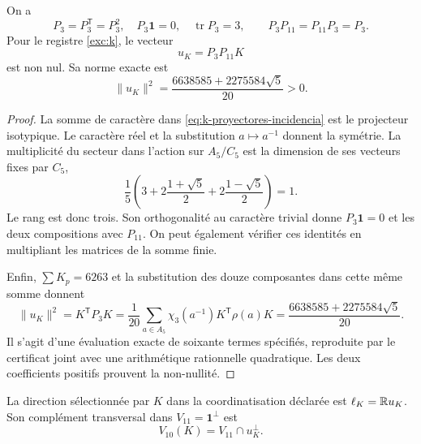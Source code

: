 \begin{lemma}
\label{lem:k-sector-no-nulo}
On a
\[
 P_3=P_3^{\mathsf T}=P_3^2,\quad
 P_3\mathbf1=0,\quad \operatorname{tr}P_3=3,
 \qquad P_3P_{11}=P_{11}P_3=P_3.
\]
Pour le registre \eqref{exc:k}, le vecteur
\begin{equation}
 u_K=P_3P_{11}K
 \label{eq:k-vector-direccional}
\end{equation}
est non nul. Sa norme exacte est
\begin{equation}
 \lVert u_K\rVert^2
 =\frac{6638585+2275584\sqrt5}{20}>0.
 \label{eq:k-norma-direccion}
\end{equation}
\end{lemma}
\begin{proof}
La somme de caractère dans \eqref{eq:k-proyectores-incidencia} est le
projecteur isotypique. Le caractère réel et la substitution \(a\mapsto a^{-1}\)
donnent la symétrie. La multiplicité du secteur dans l'action sur
\(A_5/C_5\) est la dimension de ses vecteurs fixes par \(C_5\),
\[
 \frac15\left(3+2\frac{1+\sqrt5}{2}
                 +2\frac{1-\sqrt5}{2}\right)=1.
\]
Le rang est donc trois. Son orthogonalité au caractère trivial donne \(P_3\mathbf1=0\) et les deux compositions avec \(P_{11}\). On peut également vérifier ces identités en multipliant les matrices de la somme finie.

Enfin, \(\sum K_p=6263\) et la substitution des douze
composantes dans cette même somme donnent
\[
 \lVert u_K\rVert^2=K^{\mathsf T}P_3K
 =\frac1{20}\sum_{a\in A_5}
                \chi_3(a^{-1})K^{\mathsf T}\rho(a)K
 =\frac{6638585+2275584\sqrt5}{20}.
\]
Il s'agit d'une évaluation exacte de soixante termes spécifiés,
reproduite par le certificat joint avec une arithmétique rationnelle
quadratique. Les deux coefficients positifs prouvent la non-nullité.
\end{proof}

\begin{definition}
La direction sélectionnée par \(K\) dans la coordinatisation déclarée est
\(\ell_K=\mathbb R u_K\). Son complément transversal dans
\(V_{11}=\mathbf1^\perp\) est
\[
 V_{10}(K)=V_{11}\cap u_K^\perp.
\]
\end{definition}

